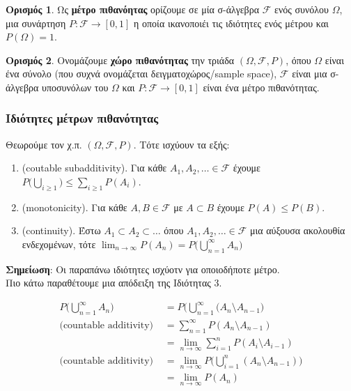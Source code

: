 \documentclass[12pt,a4paper]{article}
\theoremstyle{definition}
\numberwithin{equation}{section}
\newtheorem{orismos}{Ορισμός}
\begin{document}
\begin{orismos} Ως \textbf{μέτρο πιθανόητας} ορίζουμε σε μία σ-άλγεβρα $\mathcal{F}$ ενός συνόλου $\Omega$, μια συνάρτηση
$P: \mathcal{F} \rightarrow [0,1]$ η οποία ικανοποιέι τις ιδιότητες ενός μέτρου και $P(\Omega)=1$.\\
\end{orismos}

\begin{orismos} Ονομάζουμε \textbf{χώρο πιθανότητας} την τριάδα $(\Omega, \mathcal{F}, P)$, όπου $\Omega$ είναι ένα σύνολο (που συχνά ονομάζεται δειγματοχώρος/sample space), $\mathcal{F}$ είναι μια σ-άλγεβρα υποσυνόλων του $\Omega$ και $P:\mathcal{F}\rightarrow [0,1]$ είναι ένα μέτρο πιθανότητας.\\
\end{orismos}

\subsubsection{Ιδιότητες μέτρων πιθανότητας}
\label{sec:org1e38dcc}
Θεωρούμε τον χ.π. \((\Omega, \mathcal{F},P)\). Τότε ισχύουν τα εξής:
\begin{enumerate}
\item (coutable subadditivity). Για κάθε \(A_1,A_2,\dots \in \mathcal{F}\) έχουμε \(P\big( \bigcup_{i\geq 1} \big) \leq \sum_{i\geq 1} P(A_i)\).
\item (monotonicity). Για κάθε \(A,B \in \mathcal{F}\) με \(A\subset B\) έχουμε \(P(A)\leq P(B)\).
\item (continuity). Έστω \(A_1 \subset A_2 \subset \dots\) όπου \(A_1, A_2,\dots \in \mathcal{F}\) μια αύξουσα ακολουθία ενδεχομένων, τότε \(\lim_{n\rightarrow \infty}P(A_n) = P \big( \bigcup_{n=1}^\infty A_n \big)\)
\end{enumerate}

\textbf{Σημείωση}: Οι παραπάνω ιδιότητες ισχύοτν για οποιοδήποτε μέτρο.\\

Πιο κάτω παραθέτουμε μια απόδειξη της Ιδιότητας 3.

\begin{align*}
P\big( \bigcup_{n=1}^\infty A_n \big) &= P\big( \bigcup_{n=1}^\infty (A_n \setminus A_{n-1}\big)\\
\text{(countable additivity) } &= \sum_{n=1}^{\infty} P(A_n \setminus A_{n-1}) \\
&= \lim_{n\rightarrow \infty} \sum_{i=1}^n P(A_i\setminus A_{i-1})\\
\text{(countable additivity) } &= \lim_{n \rightarrow \infty} P\big( \bigcup_{i=1}^n(A_n \setminus A_{n-1} ) \big)\\
&= \lim_{n \rightarrow \infty} P(A_n)
\end{align*}
\end{document}
